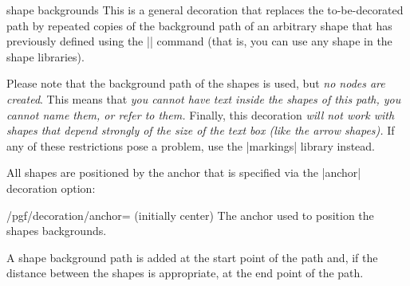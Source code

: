 \begin{decoration}{shape backgrounds}
  This is a general decoration that replaces the to-be-decorated path by repeated
  copies of the background path of an arbitrary shape that has
  previously defined using the |\pgfdeclareshape| command (that is,
  you can use any shape in the shape libraries).

  Please note that the background path of the shapes is used, but
  \emph{no nodes are created}. This means that \emph{you cannot have
    text inside the shapes of this path, you cannot name them, or
    refer to them.} Finally, this decoration \emph{will not work with
    shapes that depend  strongly of the size of the text box (like the
    arrow shapes).}  If any of these restrictions pose a problem, use
  the |markings| library instead.

\begin{codeexample}[]
\end{codeexample}

\begin{codeexample}[]
\end{codeexample}

  All shapes are positioned by the anchor that is specified via the
  |anchor| decoration option:

  \begin{key}{/pgf/decoration/anchor= (initially center)}
    The anchor used to position the shapes backgrounds.
  \end{key}

  A shape background path is added at the start point of the path and,
  if the distance between the shapes is appropriate, at the end point
  of the path.


\end{decoration}
